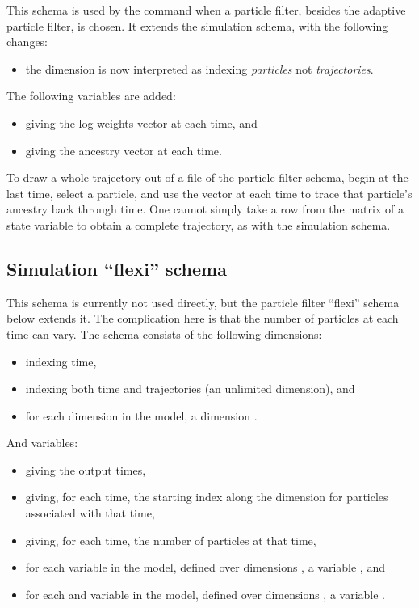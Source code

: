 This schema is used by the  command when a particle filter,
besides the adaptive particle filter, is chosen. It extends the simulation
schema, with the following changes:
\begin{itemize}
\item the  dimension is now interpreted as indexing \emph{particles}
  not \emph{trajectories}.
\end{itemize}

The following variables are added:
\begin{itemize}
\item {} giving the log-weights vector at each time, and
\item {} giving the ancestry vector at each time.
\end{itemize}

\begin{tip}
To draw a whole trajectory out of a file of the particle filter schema, begin
at the last time, select a particle, and use the  vector at
each time to trace that particle's ancestry back through time. One cannot
simply take a row from the matrix of a state variable to obtain a complete
trajectory, as with the simulation schema.
\end{tip}

\subsection{Simulation ``flexi'' schema}

This schema is currently not used directly, but the particle filter ``flexi''
schema below extends it. The complication here is that the number of
particles at each time can vary. The schema consists of the following
dimensions:
\begin{itemize}
\item {} indexing time,
\item {} indexing both time and trajectories (an unlimited dimension),
  and
\item for each dimension  in the model, a dimension
  .
\end{itemize}
And variables:
\begin{itemize}
\item {} giving the output times,
\item {} giving, for each time, the starting index along the
   dimension for particles associated with that time,
\item {} giving, for each time, the number of particles at that
  time,
\item for each  variable  in the model,
  defined over dimensions , a variable
  , and
\item for each  and  variable  in the
  model, defined over dimensions , a variable
  .
\end{itemize}

